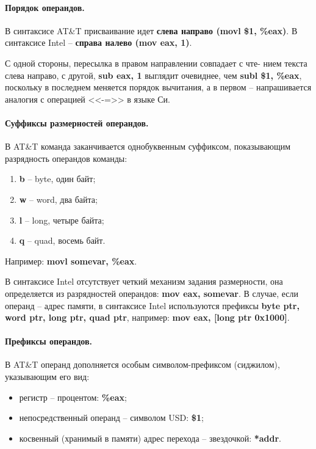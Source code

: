 \paragraph{Порядок операндов.} В синтаксисе AT\&T присваивание идет
\textbf{слева направо (movl \$1, \%eax)}. В синтаксисе Intel -- \textbf{справа налево (mov eax, 1)}.

С одной стороны, пересылка в правом направлении совпадает с чте-
нием текста слева направо, с другой, \textbf{sub eax, 1} выглядит очевиднее,
чем \textbf{subl \$1, \%eax}, поскольку в последнем меняется порядок
вычитания, а в первом -- напрашивается аналогия с операцией <<-=>> в языке Си.

\paragraph{Суффиксы размерностей операндов.} В AT\&T команда заканчивается
однобуквенным суффиксом, показывающим разрядность операндов команды:
\begin{enumerate}[1)]
\item \textbf{b} -- byte, один байт;
\item \textbf{w} -- word, два байта;
\item \textbf{l} -- long, четыре байта;
\item \textbf{q} -- quad, восемь байт.
\end{enumerate}
Например: \textbf{movl somevar, \%eax}.

В синтаксисе Intel отсутствует четкий механизм задания размерности,
она определяется из разрядностей операндов: \textbf{mov eax, somevar}. В
случае, если операнд -- адрес памяти, в синтаксисе Intel используются префиксы
\textbf{byte ptr, word ptr, long ptr, quad ptr}, например: \textbf{mov eax, [long ptr 0x1000]}.

\paragraph{Префиксы операндов.} В AT\&T операнд дополняется особым
символом-префиксом (сиджилом), указывающим его вид:
\begin{itemize}
\item регистр -- процентом: \textbf{\%eax};
\item непосредственный операнд -- символом USD: \textbf{\$1};
\item косвенный (хранимый в памяти) адрес перехода -- звездочкой: \textbf{*addr}.
\end{itemize}


